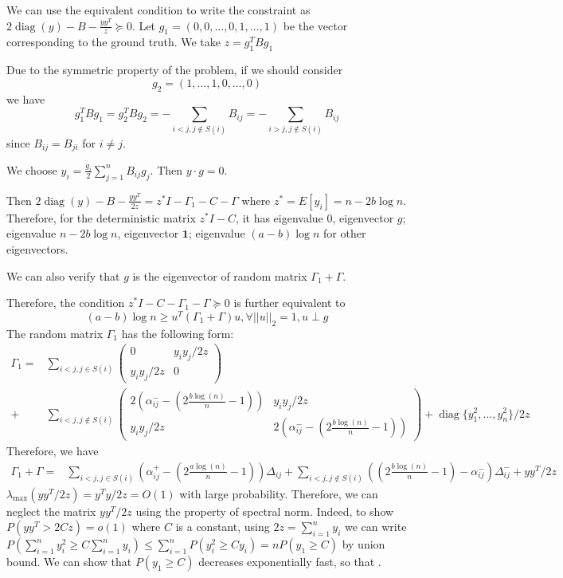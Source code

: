 \documentclass{ctexart}
\DeclareMathOperator{\diag}{diag}
\newcommand{\A}{\frac{a \log(n)}{n}}
\newcommand{\B}{\frac{b \log(n)}{n}}
\begin{document}
We can use the equivalent condition to write the constraint as
$2\diag(y)-B - \frac{yy^T}{z} \succeq 0$.
Let $g_1 = (0, 0 ,\dots, 0, 1, \dots, 1)$ be the vector corresponding to the ground truth.
We take $z = g_1^T B g_1$

Due to the symmetric property of the problem, if we should consider
$$
g_2 = (1, \dots, 1 ,0, \dots, 0)
$$
we have
\begin{equation}
g_1^T B g_1 = g_2^T B g_2 = -\sum_{i<j, j \not\in S(i)} B_{ij}
= -\sum_{i>j, j \not\in S(i)} B_{ij}
\end{equation}
since $B_{ij} = B_{ji}$ for $i\neq j$.

We choose $y_i = \frac{g_i}{2}\sum_{j=1}^n B_{ij}g_j$.
Then $y\cdot g = 0$.

Then
$2\diag(y)- B - \frac{yy^T}{2z} = z^* I - \Gamma_1 - C - \Gamma $
where $z^* = E[y_i]= n - 2b\log n$.
Therefore, for the deterministic matrix $z^* I - C$, it has eigenvalue $0$, eigenvector $g$;
eigenvalue $n-2b\log n $, eigenvector $\mathbf{1}$; eigenvalue $(a-b)\log n$ for other eigenvectors.

We can also verify that $g$ is the eigenvector of random matrix $\Gamma_1 + \Gamma$.


Therefore, the condition $z^*I - C - \Gamma_1 - \Gamma \succeq 0$ is further equivalent to
\begin{equation}\label{eq:g1}
(a-b)\log n \geq u^T (\Gamma_1 + \Gamma) u, \forall ||u||_2 = 1, u \perp g
\end{equation}
The random matrix $\Gamma_1$ has the following form:
\begin{align*}
\Gamma_1 =& \sum_{i<j, j\in S(i)}
\begin{pmatrix}
0 & y_iy_j/2z \\
y_iy_j/2z & 0
\end{pmatrix} \\
+& \sum_{i<j, j\not\in S(i)}
\begin{pmatrix}
2(\alpha_{ij}^- - (2\B-1)) & y_iy_j/2z \\
y_iy_j/2z & 2(\alpha_{ij}^- - (2\B-1))
\end{pmatrix} + \diag\{y_1^2, \dots, y_n^2\}/2z
\end{align*}
Therefore, we have
\begin{align*}
\Gamma_1 + \Gamma =& \sum_{i<j, j\in S(i)} (\alpha_{ij}^+ - (2\A-1))\Delta_{ij}
+\sum_{i<j, j\not\in S(i)} ( (2\B-1) - \alpha_{ij}^-)\Delta_{ij}^- + yy^T/2z
\end{align*}
$\lambda_{\max}(yy^T/2z) = y^Ty/2z = O(1)$ with large probability.
Therefore, we can neglect the matrix $yy^T/2z$ using the property of spectral norm.
Indeed, to show $P(yy^T > 2Cz) = o(1)$ where $C$ is a constant,
using $2z = \sum_{i=1}^n y_i$
we can write
$P(\sum_{i=1}^n y_i^2 \geq C\sum_{i=1}^n y_i) \leq \sum_{i=1}^n P(y_i^2 \geq C y_i) = nP(y_1 \geq C)$
by union bound.
We can show that $P(y_1 \geq C)$ decreases exponentially fast, so that
.
\end{document}
